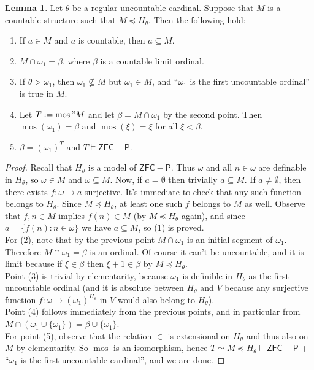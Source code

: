 \documentclass[12pt,a4paper]{report}
\theoremstyle{definition}
\newtheorem{lemma}[theorem]{Lemma}
\theoremstyle{num.custom-title}
\DeclareMathOperator{\sse}{\subseteq}
\DeclareMathOperator{\mos}{mos}
\newcommand*{\defeq}{\mathrel{\rlap{%
                     \raisebox{0.3ex}{$\cdot$}}%
                     \raisebox{-0.3ex}{$\cdot$}}%
                     =}
\begin{document}
\begin{lemma}\label{lemma-countable_elementary_substructure_of_H(theta)}
Let $\theta$ be a regular uncountable cardinal. Suppose that $M$ is a countable structure such that $M \preceq H_\theta$. Then the following hold:
\begin{enumerate}
\item If $a \in M$ and $a$ is countable, then $a \sse M$.
\item $M \cap \omega_1 = \beta$, where $\beta$ is a countable limit ordinal.
\item If $\theta > \omega_1$, then $\omega_1 \nsubseteq M$ but $\omega_1 \in M$, and ``$\omega_1$ is the first uncountable ordinal'' is true in $M$.
\item Let $T \defeq \mos"M$ and let $\beta = M \cap \omega_1$ by the second point. Then $\mos(\omega_1) = \beta$ and $\mos(\xi) = \xi$ for all $\xi < \beta$.
\item $\beta = (\omega_1)^T$ and $T \models \mathsf{ZFC-P}$.
\end{enumerate}
\begin{proof}
Recall that $H_\theta$ is a model of $\mathsf{ZFC-P}$. Thus $\omega$ and all $n \in \omega$ are definable in $H_\theta$, so $\omega \in M$ and $\omega \sse M$. Now, if $a=\emptyset$ then trivially $a \sse M$. If $a \neq \emptyset$, then there exists $f \colon \omega \to a$ surjective. It's immediate to check that any such function belongs to $H_\theta$. Since $M \preceq H_\theta$, at least one such $f$ belongs to $M$ as well. Observe that $f,n \in M$ implies $f(n) \in M$ (by $M \preceq H_\theta$ again), and since $a = \{f(n) : n \in \omega\}$ we have $a \sse M$, so (1) is proved.\\
For (2), note that by the previous point $M \cap \omega_1$ is an initial segment of $\omega_1$. Therefore $M \cap \omega_1 = \beta$ is an ordinal. Of course it can't be uncountable, and it is limit because if $\xi \in \beta$ then $\xi + 1 \in \beta$ by $M \preceq H_\theta$.\\
Point (3) is trivial by elementarity, because $\omega_1$ is definible in $H_\theta$ as the first uncountable ordinal (and it is absolute between $H_\theta$ and $V$ because any surjective function $f \colon \omega \to (\omega_1)^{H_\theta}$ in $V$ would also belong to $H_\theta$).\\
Point (4) follows immediately from the previous points, and in particular from $M \cap (\omega_1 \cup \{\omega_1\}) = \beta \cup \{\omega_1\}$.\\
For point (5), observe that the relation $\in$ is extensional on $H_\theta$ and thus also on $M$ by elementarity. So $\mos$ is an isomorphism, hence $T \simeq M \preceq H_\theta \models \mathsf{ZFC-P}$ + ``$\omega_1$ is the first uncountable cardinal'', and we are done.
\end{proof}
\end{lemma}
\end{document}
